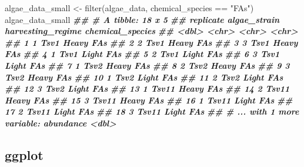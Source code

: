 \documentclass[
]{krantz}
\newenvironment{Shaded}{\begin{snugshade}}{\end{snugshade}}
\newcommand{\DocumentationTok}[1]{\textcolor[rgb]{0.56,0.35,0.01}{\textbf{\textit{#1}}}}
\newcommand{\FunctionTok}[1]{\textcolor[rgb]{0.00,0.00,0.00}{#1}}
\newcommand{\NormalTok}[1]{#1}
\newcommand{\OtherTok}[1]{\textcolor[rgb]{0.56,0.35,0.01}{#1}}
\newcommand{\SpecialCharTok}[1]{\textcolor[rgb]{0.00,0.00,0.00}{#1}}
\newcommand{\StringTok}[1]{\textcolor[rgb]{0.31,0.60,0.02}{#1}}
\begin{document}
\begin{Shaded}
\begin{Highlighting}[]
\NormalTok{algae\_data\_small }\OtherTok{\textless{}{-}} \FunctionTok{filter}\NormalTok{(algae\_data, chemical\_species }\SpecialCharTok{==} \StringTok{"FAs"}\NormalTok{)}
\NormalTok{algae\_data\_small}
\DocumentationTok{\#\# \# A tibble: 18 x 5}
\DocumentationTok{\#\#    replicate algae\_strain harvesting\_regime chemical\_species}
\DocumentationTok{\#\#        \textless{}dbl\textgreater{} \textless{}chr\textgreater{}        \textless{}chr\textgreater{}             \textless{}chr\textgreater{}           }
\DocumentationTok{\#\#  1         1 Tsv1         Heavy             FAs             }
\DocumentationTok{\#\#  2         2 Tsv1         Heavy             FAs             }
\DocumentationTok{\#\#  3         3 Tsv1         Heavy             FAs             }
\DocumentationTok{\#\#  4         1 Tsv1         Light             FAs             }
\DocumentationTok{\#\#  5         2 Tsv1         Light             FAs             }
\DocumentationTok{\#\#  6         3 Tsv1         Light             FAs             }
\DocumentationTok{\#\#  7         1 Tsv2         Heavy             FAs             }
\DocumentationTok{\#\#  8         2 Tsv2         Heavy             FAs             }
\DocumentationTok{\#\#  9         3 Tsv2         Heavy             FAs             }
\DocumentationTok{\#\# 10         1 Tsv2         Light             FAs             }
\DocumentationTok{\#\# 11         2 Tsv2         Light             FAs             }
\DocumentationTok{\#\# 12         3 Tsv2         Light             FAs             }
\DocumentationTok{\#\# 13         1 Tsv11        Heavy             FAs             }
\DocumentationTok{\#\# 14         2 Tsv11        Heavy             FAs             }
\DocumentationTok{\#\# 15         3 Tsv11        Heavy             FAs             }
\DocumentationTok{\#\# 16         1 Tsv11        Light             FAs             }
\DocumentationTok{\#\# 17         2 Tsv11        Light             FAs             }
\DocumentationTok{\#\# 18         3 Tsv11        Light             FAs             }
\DocumentationTok{\#\# \# ... with 1 more variable: abundance \textless{}dbl\textgreater{}}
\end{Highlighting}
\end{Shaded}

\hypertarget{ggplot}{%
\subsection{ggplot}\label{ggplot}}
\end{document}
